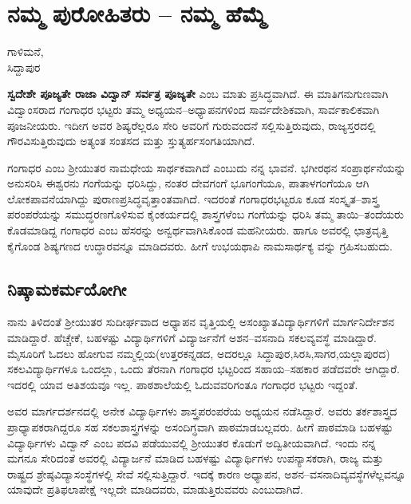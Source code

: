 {\fontsize{14}{16}\selectfont
\chapter{ನಮ್ಮ ಪುರೋಹಿತರು – ನಮ್ಮ ಹೆಮ್ಮೆ}

\begin{center}
\smallskip

ಗಾಳಿಮನೆ,\\ 
ಸಿದ್ದಾಪುರ	
\addrule
\end{center}

\textbf{ಸ್ವದೇಶೇ ಪೂಜ್ಯತೇ ರಾಜಾ ವಿದ್ವಾನ್ ಸರ್ವತ್ರ ಪೂಜ್ಯತೇ} ಎಂಬ ಮಾತು ಪ್ರಸಿದ್ಧವಾಗಿದೆ. ಈ ಮಾತಿಗನುಗುಣವಾಗಿ ವಿದ್ವಾಂಸರಾದ ಗಂಗಾಧರ ಭಟ್ಟರು ತಮ್ಮ ಅಧ್ಯಯನ–ಅಧ್ಯಾಪನಗಳಿಂದ ಸಾರ್ವದೇಶಿಕವಾಗಿ, ಸಾರ್ವಕಾಲಿಕವಾಗಿ ಪೂಜನೀಯರು. ಇದೀಗ ಅವರ ಶಿಷ್ಯರೆಲ್ಲರೂ ಸೇರಿ ಅವರಿಗೆ ಗುರುವಂದನೆ ಸಲ್ಲಿಸುತ್ತಿರುವುದು, ರಾಜ್ಯಸ್ತರದಲ್ಲಿ ಗೌರವಿಸುತ್ತಿರುವುದು ಅತ್ಯಂತ ಸಂತಸದ ಮತ್ತು ಸ್ತುತ್ಯರ್ಹಸಂಗತಿಯಾಗಿದೆ. 

ಗಂಗಾಧರ ಎಂಬ ಶ್ರೀಯುತರ ನಾಮಧೇಯ ಸಾರ್ಥಕವಾಗಿದೆ ಎಂಬುದು ನನ್ನ ಭಾವನೆ. ಭಗೀರಥನ ಸಂಪ್ರಾರ್ಥನೆಯನ್ನು ಅನುಸರಿಸಿ ಈಶ್ವರನು ಗಂಗೆಯನ್ನು ಧರಿಸಿದ್ದು, ನಂತರ  ದೇವಗಂಗೆ ಭೂಗಂಗೆಯೂ, ಪಾತಾಳಗಂಗೆಯೂ ಆಗಿ ಲೋಕಪಾವನೆಯಾಗಿದ್ದು ಪುರಾಣಪ್ರಸಿದ್ಧವೃತ್ತಾಂತವಾಗಿದೆ. ಇದರಂತೆ ಗಂಗಾಧರಭಟ್ಟರೂ ಕೂಡ ಸಂಸ್ಕೃತ–ಶಾಸ್ತ್ರ ಪರಂಪರೆಯನ್ನು ಸಮುದ್ಧರಣಗೊಳಿಸುವ ಕೈಂಕರ್ಯದಲ್ಲಿ ಶಾಸ್ತ್ರಗಳೆಂಬ ಗಂಗೆಯನ್ನು ಧರಿಸಿ ತಮ್ಮ ತಾಯಿ–ತಂದೆಯರು ಕೊಡಮಾಡಿದ್ದ ಗಂಗಾಧರ ಎಂಬ ಹೆಸರನ್ನು ಅನ್ವರ್ಥವಾಗಿಸಿಕೊಂಡ ಮಹನೀಯರು. ಹಾಗೂ ಅವರಲ್ಲಿ ಛಾತ್ರವೃತ್ತಿ ಕೈಗೊಂಡ ಶಿಷ್ಯಗಣದ ಉದ್ಧಾರವನ್ನೂ ಮಾಡಿದವರು. ಹೀಗೆ ಉಭಯಥಾಪಿ ನಾಮಸಾರ್ಥಕ್ಯ ವನ್ನು ಗ್ರಹಿಸಬಹುದು. 

\section*{ನಿಷ್ಕಾಮಕರ್ಮಯೋಗೀ} 

ನಾನು ತಿಳಿದಂತೆ ಶ್ರೀಯುತರ ಸುದೀರ್ಘವಾದ ಅಧ್ಯಾಪನ ವೃತ್ತಿಯಲ್ಲಿ ಅಸಂಖ್ಯಾತವಿದ್ಯಾರ್ಥಿಗಳಿಗೆ ಮಾರ್ಗನಿರ್ದೇಶನ ಮಾಡಿದ್ದಾರೆ. ಹೆಚ್ಚೇಕೆ, ಬಹಳಷ್ಟು ವಿದ್ಯಾರ್ಥಿಗಳಿಗೆ ವಿದ್ಯಾರ್ಜನೆಗೆ ಅಶನ–ವಸನಾದಿ ಸಕಲವ್ಯವಸ್ಥೆ ಮಾಡಿದ್ದಾರೆ. ಮೈಸೂರಿಗೆ ಓದಲು ಹೋಗುವ ನಮ್ಮಲ್ಲಿಯ(ಉತ್ತರಕನ್ನಡದ, ಅದರಲ್ಲೂ ಸಿದ್ದಾಪುರ,ಸಿರಸಿ,ಸಾಗರ,ಯಲ್ಲಾಪುರದ) ಸಕಲವಿದ್ಯಾರ್ಥಿಗಳೂ ಒಂದಲ್ಲಾ, ಒಂದು ತೆರನಾಗಿ ಗಂಗಾಧರ ಭಟ್ಟರಿಂದ ಸಹಾಯ–ಸಹಕಾರ ಪಡೆದವರೇ ಆಗಿದ್ದಾರೆ. ಇದರಲ್ಲಿ ಯಾವ ಅತಿಶಯವೂ ಇಲ್ಲ. ಪಾಠಶಾಲೆಯಲ್ಲಿ ಓದುವವರಿಗಂತೂ ಗಂಗಾಧರ ಭಟ್ಟರು  ಇದ್ದಂತೆ.  

ಅವರ ಮಾರ್ಗದರ್ಶನದಲ್ಲಿ ಅನೇಕ ವಿದ್ಯಾರ್ಥಿಗಳು ಶಾಸ್ತ್ರಪರಂಪರೆಯ ಅಧ್ಯಯನ ನಡೆಸಿದ್ದಾರೆ. ಅವರು ತರ್ಕಶಾಸ್ತ್ರದ ಪ್ರಾಧ್ಯಾಪಕರಾಗಿದ್ದರೂ ಸಹ ಸಕಲಶಾಸ್ತ್ರಗಳನ್ನು ಅಸಂದಿಗ್ಧವಾಗಿ  ಪಾಠಮಾಡಬಲ್ಲವರು. ಹೀಗೆ ಪಾಠಮಾಡಿ ಬಹಳಷ್ಟು ವಿದ್ಯಾರ್ಥಿಗಳು ವಿದ್ವಾನ್ ಎಂಬ ಪದವಿ ಪಡೆಯುವಲ್ಲಿ ಶ್ರೀಯುತರ ಕೊಡುಗೆ ಅದ್ವಿತೀಯವಾಗಿದೆ. ಇಂದು ನನ್ನ ಮಗನೂ ಸೇರಿದಂತೆ ಅವರಲ್ಲಿ ವಿದ್ಯಾರ್ಜನೆ ಮಾಡಿದ ಬಹಳಷ್ಟು ವಿದ್ಯಾರ್ಥಿಗಳು ಉಪನ್ಯಾಸಕರಾಗಿ,  ರಾಜ್ಯ ಮತ್ತು ರಾಷ್ಟ್ರದ ಶ್ರೇಷ್ಠವಿದ್ಯಾಸಂಸ್ಥೆಗಳಲ್ಲಿ ಸೇವೆ ಸಲ್ಲಿಸುತ್ತಿದ್ದಾರೆ. ಇದಕ್ಕೆ ಕಾರಣ ಅಧ್ಯಾಪನ, ಅಶನ–ವಸನಾದಿವ್ಯವಸ್ಥೆಗಳೆಲ್ಲವನ್ನೂ ಯಾವುದೇ ಪ್ರತಿಫಲಾಪೇಕ್ಷೆ ಇಲ್ಲದೇ ಮಾಡಿದವರು, ಮಾಡುತ್ತಿರುವವರು ಎಂಬುದಾಗಿದೆ. 

}

